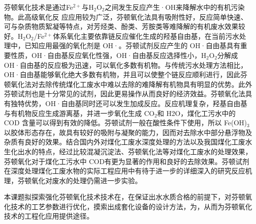 芬顿氧化技术是通过Fe$^{2+}$与H$_2$O$_2$之间发生反应产生·OH来降解水中的有机污染物。此高级氧化反 应应用较为广泛，芬顿氧化法具有吸附性好，反应简单快速、可与杂质物质絮凝等特点，对芳烃类、酚类、芳胺类等难降解的有机废水效果较好。H$_2$O$_2$/Fe$^{2+}$体系氧化主要依靠链反应催化生成的羟基自由基，在当前污水处理中，已知应用最强的氧化剂是 OH·。芬顿试剂反应产生的 OH·自由基具有重要性质，OH·自由基反应氧化性强，OH·自由基反应选择性小，H$_2$O$_2$分解成 OH·自由基的反应极为迅速，可以氧化多数有机物。与传统污水处理方法相比，OH·自由基能够氧化绝大多数有机物，并且可以使整个链反应顺利进行，因此芬顿氧化法对去除传统煤化工废水中难以去除的难降解有机物具有明显的优势。此外芬顿试剂也是十分常见的试剂，因此更易操作从而良好的经济效益。芬顿氧化法具有独特优势，OH·自由基同时还可以发生加成反应。反应机理复杂，羟基自由基与有机物反应生成游离基，并进一步氧化生成 CO$_2$和 H2O，煤化工污水中的 COD 含量可以得到有效的降低。芬顿试剂一般在酸性条件下使用，所以 Fe(OH)$_3$以胶体形态存在，故具有较好的吸附与凝聚的能力，因而对去除水中部分悬浮物及杂质有良好的效果。结合国内外对煤化工废水深度处理的方法以及我国煤化工废水生化出水的特点，经过比较混凝沉淀法、芬顿氧化法等对煤化工废水的处理效果，芬顿氧化对于煤化工污水中 COD有更为显著的作用和良好的去除效果。芬顿试剂在深度处理煤化工废水物的实际工程应用中有待于进一步的详细深入的研究反应机理，芬顿氧化对废水的处理仍需进一步实验。\par
本课题拟探索强化芬顿氧化技术技术在，在保证出水水质合格的前提下，对芬顿氧化技术的工艺参数进行优化，摸索出成套化设备的设计方法，为，从而为芬顿氧化技术的工程化应用提供途径。\par

